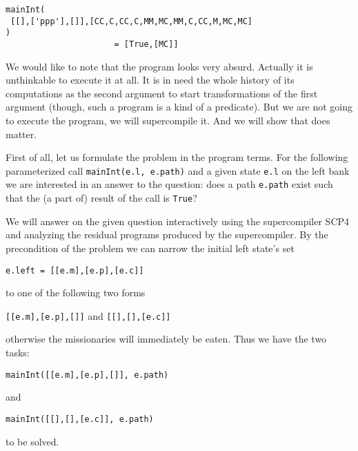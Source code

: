 \documentclass[preprint]{sigplanconf}
\begin{document}
\noindent
\begin{verbatim}
mainInt(
 [[],['ppp'],[]],[CC,C,CC,C,MM,MC,MM,C,CC,M,MC,MC]
) 
                      = [True,[MC]]
\end{verbatim}

We would like to note that the program looks very absurd. Actually it is unthinkable to execute it at all. It is in need the whole history of its computations as the second argument to start transformations of the first argument
(though, such a program is a kind of a predicate).  
But we are not going to execute the program, we will supercompile it. And we will show that does matter. 

First of all, let us formulate the problem in the program terms. For the following parameterized call \texttt{mainInt(e.l, e.path)} and a given state \texttt{e.l} on the left bank we are interested in an answer to the question: does a path \texttt{e.path} exist such that the (a part of) result of the call is \texttt{True}?  

We will answer on the given question interactively using the supercompiler SCP4 and analyzing the residual programs produced by the supercompiler.  By the precondition of the problem we can narrow the initial left state's set 
\begin{center}
\texttt{e.left = [[e.m],[e.p],[e.c]]}
\end{center} 
to one of the following two forms  
\begin{center}
\texttt{[[e.m],[e.p],[]]} and \texttt{[[],[],[e.c]]}
\end{center}
otherwise the missionaries will immediately be eaten. Thus we have the two tasks: 
\begin{center}
\texttt{mainInt([[e.m],[e.p],[]], e.path)} 
\end{center}
and 
\begin{center}
\texttt{mainInt([[],[],[e.c]], e.path)} 
\end{center}
to be solved. 
\end{document}
